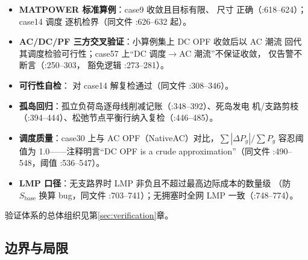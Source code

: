 \begin{itemize}
  \item \textbf{MATPOWER 标准算例}：case9 收敛且目标有限、 尺寸
        正确（:618--624）；case14 调度
        逐机检界（同文件 :626--632 起）。
  \item \textbf{AC/DC/PF 三方交叉验证}：小算例集上 DC OPF 收敛后以 AC 潮流
        回代其调度检验可行性；case57 上“DC 调度$\to$AC 潮流”不保证收敛，
        仅告警不断言（:250--303，
        豁免逻辑 :273--281）。
  \item \textbf{可行性自检}： 对 case14
        解复检通过（同文件 :308--346）。
  \item \textbf{孤岛回归}：孤立负荷岛逐母线削减记账（:348--392）、死岛发电
        机/支路剪枝（:394--444）、松弛节点平衡行纳入复检（:446--485）。
  \item \textbf{调度质量}：case30 上与 AC OPF（NativeAC）对比，$\sum|\Delta
        P_g|/\sum P_g$ 容忍阈值为 1.0——注释明言“DC OPF is a crude
        approximation”（同文件 :490--548，阈值 :536--547）。
  \item \textbf{LMP 口径}：无支路界时 LMP 非负且不超过最高边际成本的数量级
        （防 $S_{\mathrm{base}}$ 换算 bug，同文件 :703--741）；无拥塞时全网
        LMP 一致（:748--774）。
\end{itemize}
验证体系的总体组织见第\ref{sec:verification}章。

\subsection{边界与局限}

